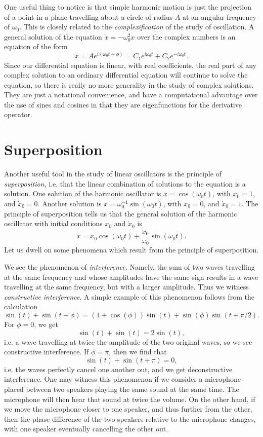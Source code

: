 %
One useful thing to notice is that simple harmonic motion is just the projection of a point in a plane travelling about a circle of radius $A$ at an angular frequency of $\omega_0$. This is closely related to the \emph{complexification} of the study of oscillation. A general solution of the equation $\dot{x} = - \omega_0^2 x$ over the complex numbers is an equation of the form
%
\[ x = A e^{i (\omega_0 t + \phi)} = C_1 e^{i \omega_0 t} + C_2 e^{-i \omega_0 t}. \]
%
Since our differential equation is linear, with real coefficients, the real part of any complex solution to an ordinary differential equation will continue to solve the equation, so there is really no more generality in the study of complex solutions. They are just a notational convenience, and have a computational advantage over the use of sines and cosines in that they are eigenfunctions for the derivative operator.

\section{Superposition}

Another useful tool in the study of linear oscillators is the principle of \emph{superposition}, i.e. that the linear combination of solutions to the equation is a solution. One solution of the harmonic oscillator is $x = \cos(\omega_0 t)$, with $x_0 = 1$, and $\dot{x}_0 = 0$. Another solution is $x = \omega_0^{-1} \sin(\omega_0 t)$, with $x_0 = 0$, and $\dot{x}_0 = 1$. The principle of superposition tells us that the general solution of the harmonic oscillator with initial conditions $x_0$ and $\dot{x}_0$ is
%
\[ x = x_0 \cos(\omega_0 t) + \frac{\dot{x}_0}{\omega_0} \sin(\omega_0 t). \]
%
Let us dwell on some phenomena which result from the principle of superposition.

We see the phenomenon of \emph{interference}. Namely, the sum of two waves travelling at the same frequency and whose amplitudes have the same sign results in a wave travelling at the same frequency, but with a larger amplitude. Thus we witness \emph{constructive interference}. A simple example of this phenomenon follows from the calculation
%
\[ \sin(t) + \sin(t + \phi) = (1 + \cos(\phi)) \sin(t) + \sin(\phi) \sin(t + \pi/2). \]
%
For $\phi = 0$, we get
%
\[ \sin(t) + \sin(t) = 2 \sin(t), \]
%
i.e. a wave travelling at twice the amplitude of the two original waves, so we see constructive interference. If $\phi = \pi$, then we find that
%
\[ \sin(t) + \sin(t + \pi) = 0, \]
%
i.e. the waves perfectly cancel one another out, and we get deconstructive interference. One may witness this phenomenon if we consider a microphone placed between two speakers playing the same sound at the same time. The microphone will then hear that sound at twice the volume. On the other hand, if we move the microphone closer to one speaker, and thus further from the other, then the phase difference of the two speakers relative to the microphone changes, with one speaker eventually cancelling the other out.

